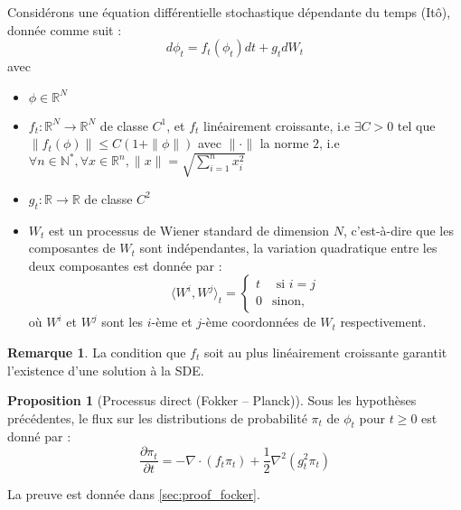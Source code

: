 \documentclass[a4paper,10pt]{article}
\theoremstyle{definition} %
\theoremstyle{definition} %
\newtheorem{proposition}[definition]{Proposition}
\theoremstyle{definition} %
\theoremstyle{definition} %
\newtheorem{remark}[definition]{Remarque}
\newcommand{\R}{\mathbb{R}}
\newcommand{\N}{\mathbb{N}}
\begin{document}
Considérons une équation différentielle stochastique dépendante du temps (Itô), donnée comme suit :
    \begin{equation}\label{eq:SDE}
         d\phi_t = f_t(\phi_t)dt + g_tdW_t
    \end{equation}
    avec 
    \begin{itemize}
        \item $\phi \in \R^N$
        \item $f_t:\R^N \rightarrow \R^N$ de classe $C^1$, et $f_t$ linéairement croissante, i.e $\exists C > 0$ tel que $\|f_t(\phi)\| \leq C(1+\| \phi \|)$ avec $\| \cdot \|$ la norme $2$, i.e $ \forall n \in \N^*, \forall x \in \R^n,  \| x \| = \sqrt{\sum_{i=1}^n x_i^2}$
        \item $g_t : \R \rightarrow \R$ de classe $C^2$
        \item $W_t$ est un processus de Wiener standard de dimension $N$, c'est-à-dire que les composantes de $W_t$ sont indépendantes, la variation quadratique entre les deux composantes est donnée par :
            \begin{equation*}
                \langle W^i, W^j \rangle_t =
                    \begin{cases}    
                        t & \textrm{ si } i=j \\
                        0 & \textrm{sinon},
                    \end{cases}
            \end{equation*}
            où $W^i$ et $W^j$ sont les $i$-ème et $j$-ème coordonnées de $W_t$ respectivement. 
    \end{itemize}
    \begin{remark}
        La condition que $f_t$ soit au plus linéairement croissante garantit l'existence d'une solution à la SDE.
    \end{remark}

\begin{proposition}[Processus direct (Fokker – Planck)\label{prop:fokker}] 
Sous les hypothèses précédentes, le flux sur les distributions de probabilité $\pi_t$ de $\phi_t$ pour $t \geq 0$ est donné par :
    \begin{equation}\label{eq:Fokker-Planck}
        \frac{\partial\pi_t}{\partial t} = -\nabla \cdot (f_t \pi_t) + \frac{1}{2}\nabla^2(g_t^2\pi_t)
    \end{equation}
\end{proposition}
La preuve est donnée dans \cref{sec:proof_focker}.
\end{document}
